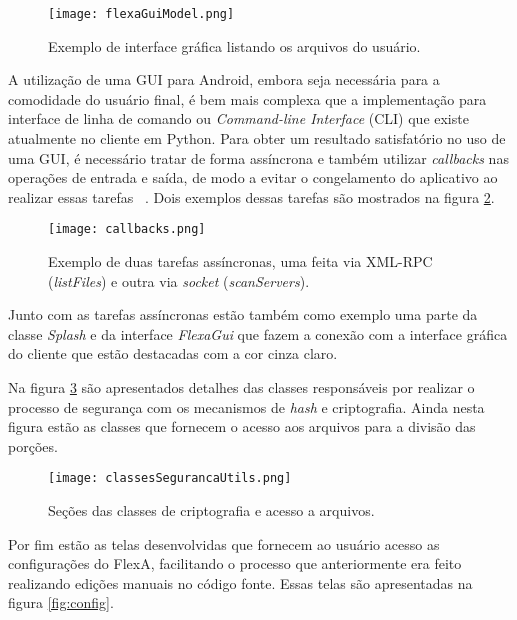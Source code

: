         \begin{figure}[!ht]
        \centering
        \texttt{[image: flexaGuiModel.png]}
        \caption{Exemplo de interface gráfica listando os arquivos do usuário.}
        \label{fig:flexaGuiModel}
        \end{figure}
        
        A utilização de uma GUI para Android, embora seja necessária para a comodidade do usuário final, é bem mais complexa que a implementação para interface de linha de comando ou \textit{Command-line Interface} (CLI) que existe atualmente no cliente em Python. Para obter um resultado satisfatório no uso de uma GUI, é necessário tratar de forma assíncrona e também utilizar \textit{callbacks} nas operações de entrada e saída, de modo a evitar o congelamento do aplicativo ao realizar essas tarefas ~\cite{androidAssyncTask}. Dois exemplos dessas tarefas são mostrados na figura \ref{fig:assyncCallback}.
        
        \begin{figure}[!ht]
        \centering
        \texttt{[image: callbacks.png]}
        \caption{Exemplo de duas tarefas assíncronas, uma feita via XML-RPC (\textit{listFiles}) e outra via \textit{socket} (\textit{scanServers}).}
        \label{fig:assyncCallback}
        \end{figure}
        
    Junto com as tarefas assíncronas estão também como exemplo uma parte da classe \textit{Splash} e da interface \textit{FlexaGui} que fazem a conexão com a interface gráfica do cliente que estão destacadas com a cor cinza claro.
    
    Na figura \ref{fig:classesSeg} são apresentados detalhes das classes responsáveis por realizar o processo de segurança com os mecanismos de \textit{hash} e criptografia. Ainda nesta figura estão as classes que fornecem o acesso aos arquivos para a divisão das porções.
    
        \begin{figure}[!ht]
        \centering
        \texttt{[image: classesSegurancaUtils.png]}
        \caption{Seções das classes de criptografia e acesso a arquivos.}
        \label{fig:classesSeg}
        \end{figure}
        
    Por fim estão as telas desenvolvidas que fornecem ao usuário acesso as configurações do FlexA, facilitando o processo que anteriormente era feito realizando edições manuais no código fonte. Essas telas são apresentadas na figura \ref{fig:config}.
    
